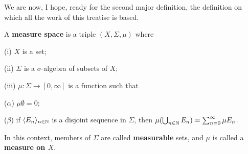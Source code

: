 
\def\chaptername{Measure spaces}
\def\sectionname{Measure spaces}


We are now, I hope, ready for the second major definition, the
definition on which all the work of this treatise is based.

 A {\bf measure space} is a triple
$(X,\Sigma,\mu)$ where

\quad(i) $X$ is a set;

\quad(ii) $\Sigma$ is a $\sigma$-algebra of subsets of $X$;

\quad(iii) $\mu:\Sigma\to[0,\infty]$ is a function such that

\qquad($\alpha$) $\mu\emptyset=0$;

\qquad($\beta$) if $\langle E_n\rangle_{n\in\Bbb N}$ is a disjoint
sequence in $\Sigma$, then
$\mu(\bigcup_{n\in\Bbb N}E_n)=\sum_{n=0}^{\infty}\mu E_n$.

\noindent In this context, members of $\Sigma$ are called {\bf
measurable} sets, and $\mu$ is called a {\bf measure on $X$}.

